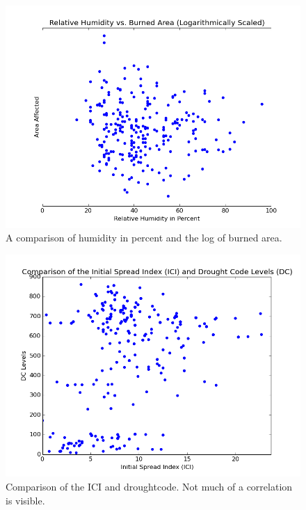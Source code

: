 \documentclass[12pt]{article}
\begin{document}
\begin{figure}[!htb]
\begin{center}
  \includegraphics[scale=0.4]{humidity-area.png}
  \caption{A comparison of humidity in percent and the log of burned area.}
\end{center}
\end{figure}

\begin{figure}[!htb]
\begin{center}
  \includegraphics[scale=0.4]{ici-droughtcode.png}
  \caption{Comparison of the ICI and droughtcode. Not much of a correlation is visible.}
\end{center}
\end{figure}
\end{document}

